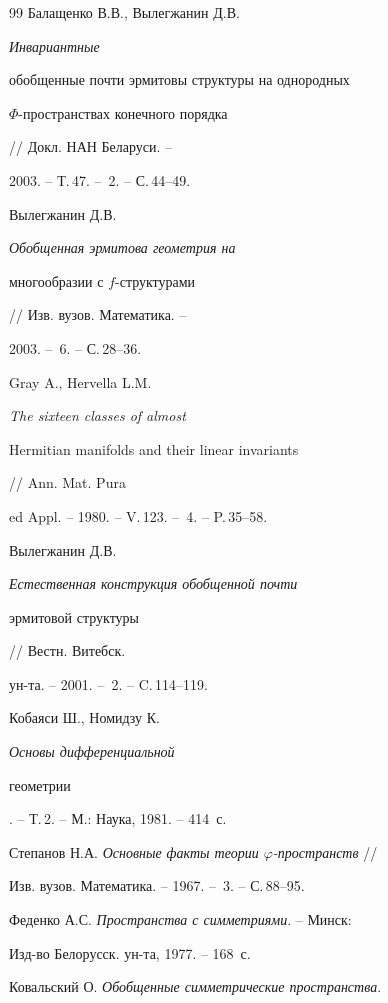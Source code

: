 \begin{thebibliography}{99}
 Балащенко В.В., Вылегжанин Д.В. {\it Инвариантные


обобщенные почти эрмитовы структуры на однородных


$\Phi$-пространствах конечного порядка} // Докл. НАН Беларуси. --


2003. -- Т.\,47. -- \No\,2. -- С.\,44--49.





 Вылегжанин Д.В. {\it Обобщенная эрмитова геометрия на


многообразии с $f$-структурами} // Изв. вузов. Математика. --


2003. -- \No\,6. -- С.\,28--36.





 Gray A., Hervella L.M. {\it The sixteen classes of almost


Hermitian manifolds and their linear invariants} // Ann. Mat. Pura


ed Appl. -- 1980. -- V.\,123. -- \No\,4. -- P.\,35--58.





 Вылегжанин Д.В. {\it Естественная конструкция обобщенной почти


эрмитовой структуры} // Вестн. Витебск. 


ун-та. -- 2001. --  \No\,2. -- C.\,114--119.





 Кобаяси Ш., Номидзу К. {\it Основы дифференциальной


геометрии}. -- Т.\,2. -- М.: Наука, 1981. -- 414~с.





 Степанов Н.А. {\it Основные факты теории $\varphi$-пространств} //


Изв. вузов. Математика. -- 1967. -- \No\,3. -- С.\,88--95.





 Феденко А.С. {\it Пространства с симметриями}. -- Минск:


Изд-во Белорусск. ун-та, 1977. -- 168~с.





 Ковальский О. {\it Обобщенные симметрические пространства}.



\end{thebibliography}
